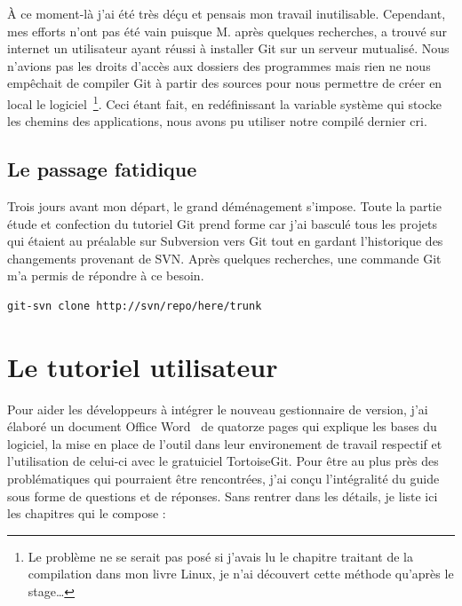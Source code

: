 À ce moment-là j'ai été très déçu et pensais mon travail inutilisable.
Cependant, mes efforts n'ont pas été vain puisque M. après
quelques recherches, a trouvé sur internet un utilisateur ayant réussi à
installer Git sur un serveur mutualisé.  Nous n'avions pas les droits d'accès
aux dossiers des programmes mais rien ne nous empêchait de compiler Git à
partir des sources pour nous permettre de créer en local le logiciel\,
\footnote{Le problème ne se serait pas posé si j'avais lu le chapitre traitant
de la compilation dans mon livre Linux, je n'ai découvert cette méthode
qu'après le stage\dots}. Ceci étant fait, en redéfinissant la variable système
qui stocke les chemins des applications, nous avons pu utiliser notre compilé
dernier cri.

\subsection{Le passage fatidique} %
\label{sub:Le passage fatidique}

Trois jours avant mon départ, le grand déménagement s'impose. Toute la partie
étude et confection du tutoriel Git prend forme car j'ai basculé tous les
projets qui étaient au préalable sur Subversion vers Git tout en gardant
l'historique des changements provenant de SVN. Après quelques recherches, une
commande Git m'a permis de répondre à ce besoin.\\

\begin{lstlisting}[basicstyle=\ttfamily\small, frame=trBL]
git-svn clone http://svn/repo/here/trunk
\end{lstlisting}

\section{Le tutoriel utilisateur} %
\label{sec:Le tutoriel utilisateur}

Pour aider les développeurs à intégrer le nouveau gestionnaire de version, j'ai
élaboré un document Office Word~\textregistered{} de quatorze pages qui explique
les bases du logiciel, la mise en place de l'outil dans leur environement de
travail respectif et l'utilisation de celui-ci avec le gratuiciel TortoiseGit.
Pour être au plus près des problématiques qui pourraient être rencontrées, j'ai
conçu l'intégralité du guide sous forme de questions et de réponses. Sans
rentrer dans les détails, je liste ici les chapitres qui le compose :

